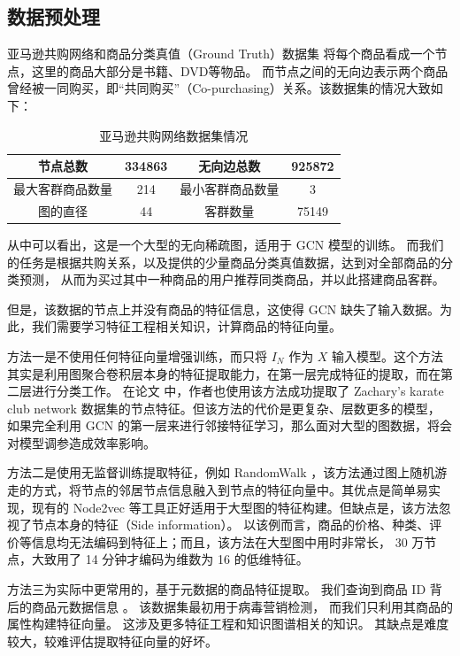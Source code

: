 \documentclass[12pt]{ctexart} %
\begin{document}
\subsection*{数据预处理}

亚马逊共购网络和商品分类真值（Ground Truth）数据集 \cite{yang_defining_2012} 将每个商品看成一个节点，这里的商品大部分是书籍、DVD等物品。
而节点之间的无向边表示两个商品曾经被一同购买，即“共同购买”（Co-purchasing）关系。该数据集的情况大致如下：

\begin{table}[h]
    \centering
    \begin{tabular}{|c|c|c|c|}
        \hline
        节点总数 &  334863 & 无向边总数 & 925872 \\
        \hline
        最大客群商品数量 & 214 & 最小客群商品数量 & 3 \\
        \hline
        图的直径 & 44 & 客群数量 & 75149 \\
        \hline
    \end{tabular}
    \caption{亚马逊共购网络数据集情况}
    \label{tab:amazon-table}
\end{table}


从中可以看出，这是一个大型的无向稀疏图，适用于 GCN 模型的训练。
而我们的任务是根据共购关系，以及提供的少量商品分类真值数据，达到对全部商品的分类预测，
从而为买过其中一种商品的用户推荐同类商品，并以此搭建商品客群。

但是，该数据的节点上并没有商品的特征信息，这使得 GCN 缺失了输入数据。为此，我们需要学习特征工程相关知识，计算商品的特征向量。

方法一是不使用任何特征向量增强训练，而只将 $I_N$ 作为 $X$ 输入模型。这个方法其实是利用图聚合卷积层本身的特征提取能力，在第一层完成特征的提取，而在第二层进行分类工作。
在论文 \cite{kipf2017semi} 中，作者也使用该方法成功提取了 Zachary’s karate club network 数据集的节点特征。但该方法的代价是更复杂、层数更多的模型，
如果完全利用 GCN 的第一层来进行邻接特征学习，那么面对大型的图数据，将会对模型调参造成效率影响。

方法二是使用无监督训练提取特征，例如 RandomWalk ，该方法通过图上随机游走的方式，将节点的邻居节点信息融入到节点的特征向量中。其优点是简单易实现，现有的
Node2vec \cite{grover_node2vec_2016} 等工具正好适用于大型图的特征构建。但缺点是，该方法忽视了节点本身的特征（Side information）。
以该例而言，商品的价格、种类、评价等信息均无法编码到特征上；而且，该方法在大型图中用时非常长， 30 万节点，大致用了 14 分钟才编码为维数为 16 的低维特征。

方法三为实际中更常用的，基于元数据的商品特征提取。
我们查询到商品 ID 背后的商品元数据信息 \cite{leskovec_dynamics_2007}。
该数据集最初用于病毒营销检测，
而我们只利用其商品的属性构建特征向量。
这涉及更多特征工程和知识图谱相关的知识。
其缺点是难度较大，较难评估提取特征向量的好坏。
\end{document}
